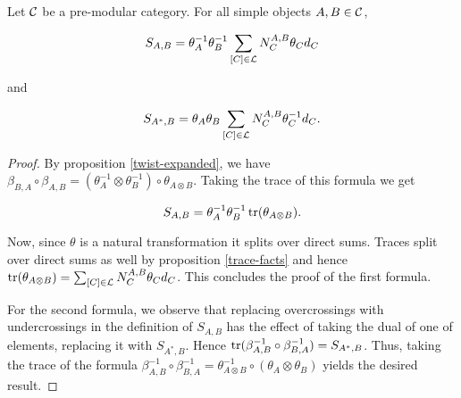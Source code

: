 \begin{lem}\label{S-matrix-expansion} Let ${\mathcal C}$ be a pre-modular category. For all simple objects $A,B\in {\mathcal C}$,

$$S_{A,B}=\theta_A^{-1}\theta_{B}^{-1}\sum_{[C]\in {\mathcal L}}N^{A,B}_{C}\theta_{C}d_C$$

and

$$S_{A^*,B}=\theta_A\theta_{B}\sum_{[C]\in {\mathcal L}}N^{A,B}_{C}\theta^{-1}_{C}d_C.$$
\end{lem}
\begin{proof} By proposition \ref{twist-expanded}, we have $\beta_{B,A}\circ \beta_{A,B}=(\theta_{A}^{-1}\otimes \theta_{B}^{-1}) \circ \theta_{A\otimes B }$. Taking the trace of this formula we get

$$S_{A,B}=\theta_{A}^{-1}\theta_{B}^{-1}\operatorname{tr}(\theta_{A\otimes B}).$$

Now, since $\theta$ is a natural transformation it splits over direct sums. Traces split over direct sums as well by proposition \ref{trace-facts} and hence $\operatorname{tr}(\theta_{A\otimes B})=\sum_{[C]\in {\mathcal L}}N^{A,B}_{C}\theta_{C}d_C$. This concludes the proof of the first formula.

For the second formula, we observe that replacing overcrossings with undercrossings in the definition of $S_{A,B}$ has the effect of taking the dual of one of elements, replacing it with $S_{A^*,B}$. Hence $\operatorname{tr}(\beta_{A,B}^{-1}\circ \beta_{B,A}^{-1})=S_{A^*,B}$. Thus, taking the trace of the formula $\beta_{A,B}^{-1}\circ \beta_{B,A}^{-1}=\theta^{-1}_{A\otimes B }\circ (\theta_{A}\otimes \theta_{B})$ yields the desired result.
\end{proof}

